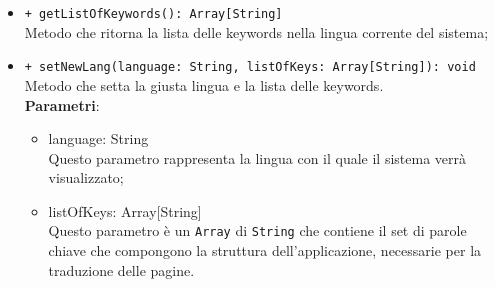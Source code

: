 \begin{itemize}
\begin{itemize}
				\item \texttt{+ getListOfKeywords(): Array[String]} \\
				Metodo che ritorna la lista delle keywords nella lingua corrente del sistema;
				
				\item \texttt{+ setNewLang(language: String, listOfKeys: Array[String]): void} \\
				Metodo che setta la giusta lingua e la lista delle keywords.\\
				\textbf{Parametri}:
				\begin{itemize}
					\item {language: String}\\
					Questo parametro rappresenta la lingua con il quale il sistema verrà visualizzato;
					\item {listOfKeys: Array[String]}\\
					Questo parametro è un \texttt{Array} di \texttt{String} che contiene il set di parole chiave che compongono la struttura dell'applicazione, necessarie per la traduzione delle pagine.
				\end{itemize}
				
			\end{itemize}
		\end{itemize}
		
		
